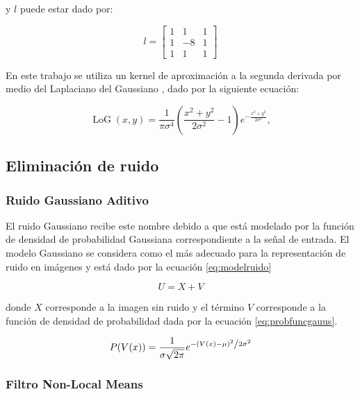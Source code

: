 y $l$ puede estar dado por:

\begin{equation} l = \left[
\begin{array}{ccc}
1 & 1 & 1\\
1 & -8 & 1\\
1 & 1 & 1
\end{array}\right]
\end{equation}

En este trabajo se utiliza un kernel de aproximaci\'on a la segunda derivada por medio del Laplaciano del Gaussiano \cite{sotak1989laplacian}, dado por la siguiente ecuaci\'on:

\begin{equation}
\operatorname{LoG}(x,y) = \frac{1}{\pi\sigma^4}\left(\frac{x^2+y^2}{2\sigma^2} - 1\right)e^{-\frac{x^2+y^2}{2\sigma^2}},
\end{equation}


\subsection{Eliminaci\'on de ruido}

\subsubsection{Ruido Gaussiano Aditivo}

El ruido Gaussiano recibe este nombre debido a que est\'a modelado por la funci\'on de densidad de probabilidad Gaussiana correspondiente a la se\~nal de entrada. El modelo Gaussiano se considera como el m\'as adecuado para la representaci\'on de ruido en im\'agenes y est\'a dado por la ecuaci\'on \ref{eq:modelruido}

\begin{equation}
\label{eq:modelruido}
U = X + V
\end{equation}

 donde $X$ corresponde a la imagen sin ruido y el t\'ermino $V$ corresponde a la funci\'on de densidad de probabilidad dada por la ecuaci\'on \ref{eq:probfuncgauus}.

\begin{equation}
\label{eq:probfuncgauus}
P(V(x)) = \frac{1}{{\sigma \sqrt {2\pi } }}e^{{{ - \left( {V(x) - \mu } \right)^2 } \mathord{\left/ {\vphantom {{ - \left( {x - \mu } \right)^2 } {2\sigma ^2 }}} \right. \kern-\nulldelimiterspace} {2\sigma ^2 }}}
\end{equation}


\subsubsection{Filtro Non-Local Means}

